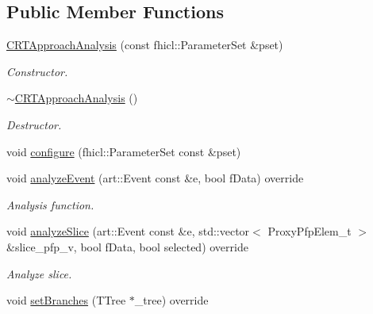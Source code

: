 \subsection*{Public Member Functions}
\begin{DoxyCompactItemize}
\item 
\hyperlink{classanalysis_1_1CRTApproachAnalysis_a15b3a1fc6bdd4cea8e96d604ea40e061}{C\+R\+T\+Approach\+Analysis} (const fhicl\+::\+Parameter\+Set \&pset)
\begin{DoxyCompactList}\small\item\em Constructor. \end{DoxyCompactList}\item 
\hyperlink{classanalysis_1_1CRTApproachAnalysis_a4a25552da3eaba21e3d17b78d10c4bce}{$\sim$\+C\+R\+T\+Approach\+Analysis} ()\hypertarget{classanalysis_1_1CRTApproachAnalysis_a4a25552da3eaba21e3d17b78d10c4bce}{}\label{classanalysis_1_1CRTApproachAnalysis_a4a25552da3eaba21e3d17b78d10c4bce}

\begin{DoxyCompactList}\small\item\em Destructor. \end{DoxyCompactList}\item 
void \hyperlink{classanalysis_1_1CRTApproachAnalysis_a6e86e8f45b26d8712cd5749b2e983a10}{configure} (fhicl\+::\+Parameter\+Set const \&pset)
\item 
void \hyperlink{classanalysis_1_1CRTApproachAnalysis_ad367db2555c9f7b34b9854e3e21bf9ca}{analyze\+Event} (art\+::\+Event const \&e, bool f\+Data) override\hypertarget{classanalysis_1_1CRTApproachAnalysis_ad367db2555c9f7b34b9854e3e21bf9ca}{}\label{classanalysis_1_1CRTApproachAnalysis_ad367db2555c9f7b34b9854e3e21bf9ca}

\begin{DoxyCompactList}\small\item\em Analysis function. \end{DoxyCompactList}\item 
void \hyperlink{classanalysis_1_1CRTApproachAnalysis_a1ec2e53aa488645ad8c7ba625699d394}{analyze\+Slice} (art\+::\+Event const \&e, std\+::vector$<$ Proxy\+Pfp\+Elem\+\_\+t $>$ \&slice\+\_\+pfp\+\_\+v, bool f\+Data, bool selected) override\hypertarget{classanalysis_1_1CRTApproachAnalysis_a1ec2e53aa488645ad8c7ba625699d394}{}\label{classanalysis_1_1CRTApproachAnalysis_a1ec2e53aa488645ad8c7ba625699d394}

\begin{DoxyCompactList}\small\item\em Analyze slice. \end{DoxyCompactList}\item 
void \hyperlink{classanalysis_1_1CRTApproachAnalysis_a457c95415578481a7c92b6b676b39550}{set\+Branches} (T\+Tree $\ast$\+\_\+tree) override\hypertarget{classanalysis_1_1CRTApproachAnalysis_a457c95415578481a7c92b6b676b39550}{}\label{classanalysis_1_1CRTApproachAnalysis_a457c95415578481a7c92b6b676b39550}


\end{DoxyCompactItemize}
